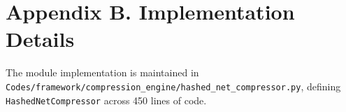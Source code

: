 \section*{Appendix B. Implementation Details}
The module implementation is maintained in \texttt{Codes/framework/compression\_engine/hashed\_net\_compressor.py}, defining \texttt{HashedNetCompressor} across 450 lines of code.
